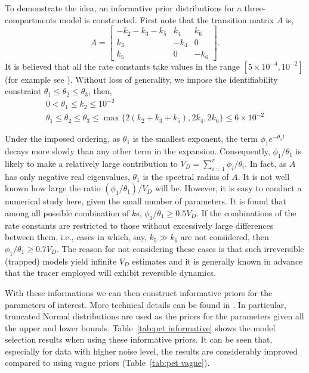 To demonstrate the idea, an informative prior distributions for a
three-compartments model is constructed. First note that the transition matrix
$A$ is,
\begin{equation*}
  A = \begin{bmatrix}
    - k_2 - k_3 - k_5 & k_4  & k_6 \\
    k_3               & -k_4 & 0   \\
    k_5               & 0    & -k_6
  \end{bmatrix}.
\end{equation*}
It is believed that all the rate constants take values in the range $[5 \times
10^{-4}, 10^{-2}]$ (for example see \cite{Zhou2013,Peng:2008fx}). Without loss
of generality, we impose the identifiability constraint $\theta_1 \leq
\theta_2 \leq \theta_3$, then,
\begin{gather}
  0 < \theta_1 \le k_2 \le 10^{-2} \\
  \theta_1 \leq \theta_2 \leq \theta_3 \leq \max\{2(k_2 + k_3 + k_5), 2k_4,
  2k_6\} \le 6 \times 10^{-2}
\end{gather}

Under the imposed ordering, as $\theta_1$ is the smallest exponent, the term
$\phi_1e^{-\theta_1 t}$ decays more slowly than any other term in the
expansion. Consequently, $\phi_1/\theta_1$ is likely to make a relatively
large contribution to $V_D = \sum_{i=1}^r \phi_i/\theta_i$. In fact, as $A$
has only negative real eigenvalues, $\theta_1$ is the spectral radius of $A$.
It is not well known how large the ratio $(\phi_1/\theta_1)/V_D$ will be.
However, it is easy to conduct a numerical study here, given the small number
of parameters. It is found that among all possible combination of $k$s,
$\phi_1/ \theta_1 \ge 0.5 V_D$. If the combinations of the rate constants are
restricted to those without excessively large differences between them, i.e.,
cases in which, say, $k_5 \gg k_6$ are not considered, then $\phi_1/\theta_1
\ge 0.7 V_D$. The reason for not considering these cases is that such
irreversible (trapped) models yield infinite $V_D$ estimates and it is
generally known in advance that the tracer employed will exhibit reversible
dynamics.

With these informations we can then construct informative priors for the
parameters of interest. More technical details can be found in
\cite{Zhou2013}. In particular, truncated Normal distributions are used as the
priors for the parameters given all the upper and lower bounds.
Table~\ref{tab:pet informative} shows the model selection results when using
these informative priors. It can be seen that, especially for data with higher
noise level, the results are considerably improved compared to using vague
priors (Table~\ref{tab:pet vague}).

